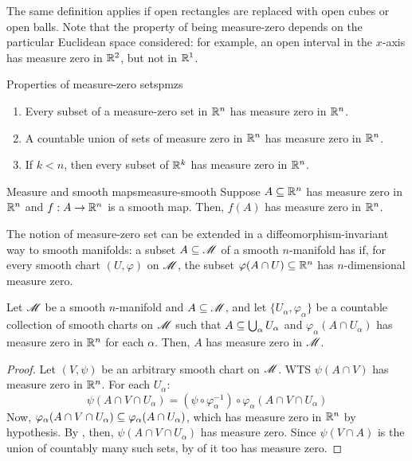 The same definition applies if open rectangles are replaced with open cubes or open balls.
Note that the property of being measure-zero depends on the particular Euclidean space considered: for example, an open interval in the $ x $-axis has measure zero in $ \mathbb{R}^2 $, but not in $ \mathbb{R}^1 $.

\begin{lemma}[before upper = {\tcbtitle}]{Properties of measure-zero sets}{pmzs}
  \begin{enumerate}
    \item \label{item:pmzs-1} Every subset of a measure-zero set in $ \mathbb{R}^n $ has measure zero in $ \mathbb{R}^n $.
    \item \label{item:pmzs-2} A countable union of sets of measure zero in $ \mathbb{R}^n $ has measure zero in $ \mathbb{R}^n $.
    \item \label{item:pmzs-3} If $ k < n $, then every subset of $ \mathbb{R}^k $ has measure zero in $ \mathbb{R}^n $.
  \end{enumerate}
\end{lemma}

\begin{proposition}{Measure and smooth maps}{measure-smooth}
  Suppose $ A \subseteq \mathbb{R}^n $ has measure zero in $ \mathbb{R}^n $ and $ f : A \rightarrow \mathbb{R}^n $ is a smooth map. Then, $ f(A) $ has measure zero in $ \mathbb{R}^n $.
\end{proposition}

The notion of measure-zero set can be extended in a diffeomorphism-invariant way to smooth manifolds: a subset $ A \subseteq \mathscr{M} $ of a smooth $ n $-manifold has  if, for every smooth chart $ (U,\varphi) $ on $ \mathscr{M} $, the subset $ \varphi(A \cap U) \subseteq \mathbb{R}^n $ has $ n $-dimensional measure zero.

\begin{lemma}{}{}
  Let $ \mathscr{M} $ be a smooth $ n $-manifold and $ A \subseteq \mathscr{M} $, and let $ \{U_\alpha , \varphi_\alpha\} $ be a countable collection of smooth charts on $ \mathscr{M} $ such that $ A \subseteq \bigcup_\alpha U_\alpha $ and $ \varphi_\alpha(A \cap U_\alpha) $ has measure zero in $ \mathbb{R}^n $ for each $ \alpha $. Then, $ A $ has measure zero in $ \mathscr{M} $.
\end{lemma}

\begin{proofbox}
  \begin{proof}
    Let $ (V,\psi) $ be an arbitrary smooth chart on $ \mathscr{M} $. WTS $ \psi(A \cap V) $ has measure zero in $ \mathbb{R}^n $. For each $ U_\alpha $:
    \begin{equation*}
      \psi(A \cap V \cap U_\alpha) = (\psi \circ \varphi_\alpha^{-1}) \circ \varphi_\alpha(A \cap V \cap U_\alpha)
    \end{equation*}
    Now, $ \varphi_\alpha(A \cap V \cap U_\alpha) \subseteq \varphi_\alpha(A \cap U_\alpha) $, which has measure zero in $ \mathbb{R}^n $ by hypothesis. By , then, $ \psi(A \cap V \cap U_\alpha) $ has measure zero. Since $ \psi(V \cap A) $ is the union of countably many such sets, by  of  it too has measure zero.
  \end{proof}
\end{proofbox}

